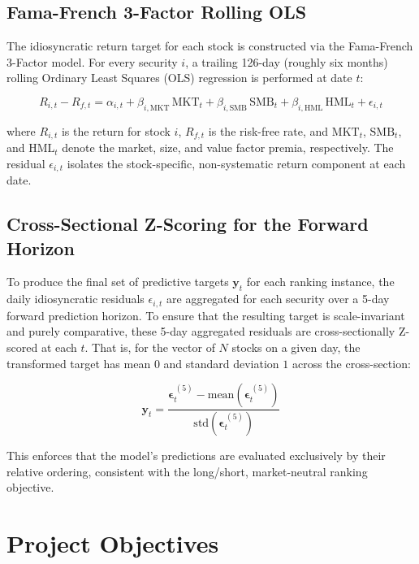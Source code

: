 \subsection*{Fama-French 3-Factor Rolling OLS}

The idiosyncratic return target for each stock is constructed via the Fama-French 3-Factor model. For every security $i$, a trailing 126-day (roughly six months) rolling Ordinary Least Squares (OLS) regression is performed at date $t$:

\begin{equation}
    R_{i,t} - R_{f,t} = \alpha_{i,t} + \beta_{i,\mathrm{MKT}}\,\mathrm{MKT}_t + \beta_{i,\mathrm{SMB}}\,\mathrm{SMB}_t + \beta_{i,\mathrm{HML}}\,\mathrm{HML}_t + \epsilon_{i,t}
\end{equation}

where $R_{i,t}$ is the return for stock $i$, $R_{f,t}$ is the risk-free rate, and $\mathrm{MKT}_t$, $\mathrm{SMB}_t$, and $\mathrm{HML}_t$ denote the market, size, and value factor premia, respectively. The residual $\epsilon_{i,t}$ isolates the stock-specific, non-systematic return component at each date.

\subsection*{Cross-Sectional Z-Scoring for the Forward Horizon}

To produce the final set of predictive targets $\mathbf{y}_t$ for each ranking instance, the daily idiosyncratic residuals $\epsilon_{i,t}$ are aggregated for each security over a 5-day forward prediction horizon. To ensure that the resulting target is scale-invariant and purely comparative, these 5-day aggregated residuals are cross-sectionally Z-scored at each $t$. That is, for the vector of $N$ stocks on a given day, the transformed target has mean $0$ and standard deviation $1$ across the cross-section:

\begin{equation}
    \mathbf{y}_t = \frac{\boldsymbol{\epsilon}^{\,(5)}_t - \mathrm{mean}(\boldsymbol{\epsilon}^{\,(5)}_t)}{\mathrm{std}(\boldsymbol{\epsilon}^{\,(5)}_t)}
\end{equation}

This enforces that the model's predictions are evaluated exclusively by their relative ordering, consistent with the long/short, market-neutral ranking objective.

\section{Project Objectives}